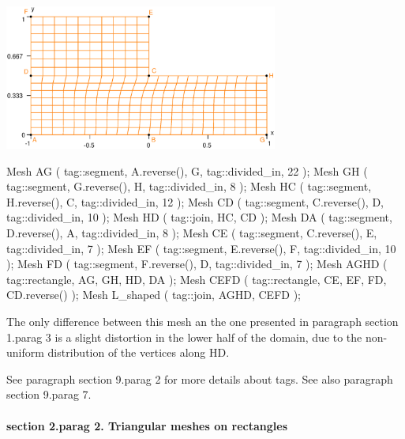 { 
\centerline{\includegraphics[width=90mm]{L-shaped-distorted.eps}} }

\verbatim
   Mesh AG ( tag::segment, A.reverse(), G, tag::divided_in, 22 );
   Mesh GH ( tag::segment, G.reverse(), H, tag::divided_in, 8 );
   Mesh HC ( tag::segment, H.reverse(), C, tag::divided_in, 12 );
   Mesh CD ( tag::segment, C.reverse(), D, tag::divided_in, 10 );
   Mesh HD ( tag::join, HC, CD );
   Mesh DA ( tag::segment, D.reverse(), A, tag::divided_in, 8 );
   Mesh CE ( tag::segment, C.reverse(), E, tag::divided_in, 7 );
   Mesh EF ( tag::segment, E.reverse(), F, tag::divided_in, 10 );
   Mesh FD ( tag::segment, F.reverse(), D, tag::divided_in, 7 );
   Mesh AGHD ( tag::rectangle, AG, GH, HD, DA );
   Mesh CEFD ( tag::rectangle, CE, EF, FD, CD.reverse() );
   Mesh L_shaped ( tag::join, AGHD, CEFD );
\endverbatim

The only difference between this mesh an the one presented in paragraph \numb section 1.\numb parag 3
is a slight distortion in the lower half of the domain,
due to the non-uniform distribution of the vertices along {\codett HD}.

See paragraph \numb section 9.\numb parag 2 for more details about tags.
See also paragraph \numb section 9.\numb parag 7.


\paragraph{\numb section 2.\numb parag 2. Triangular meshes on rectangles}

